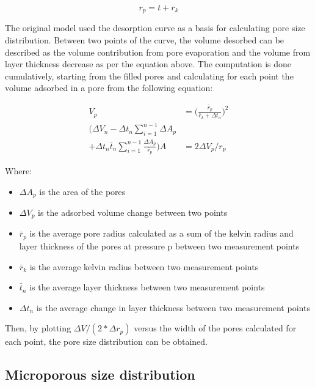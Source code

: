 \begin{equation}
    r_p = t + r_k
\end{equation}

The original model used the desorption curve as a basis for calculating pore size distribution.
Between two points of the curve, the volume desorbed can be described as the volume contribution
from pore evaporation and the volume from layer thickness decrease as per the equation
above. The computation is done cumulatively, starting from the filled pores and 
calculating for each point the volume adsorbed in a pore from the following equation:

\begin{align}
    V_p & = \Big( \frac{\bar{r}_p}{\bar{r}_k + \Delta t_n} \Big)^2 \\
    (\Delta V_n - \Delta t_n \sum_{i=1}^{n-1} \Delta A_p \\
    + \Delta t_n \bar{t}_n \sum_{i=1}^{n-1} \frac{\Delta A_p}{\bar{r}_p})
    A & = 2 \Delta V_p / r_p
\end{align}

Where:

\begin{itemize}
    
    \item \(\Delta A_p\) is the area of the pores
    \item \(\Delta V_p\) is the adsorbed volume change between two points
    \item \(\bar{r}_p\) is the average pore radius calculated as a sum of the
    kelvin radius and layer thickness of the pores at pressure p between two
    measurement points
    \item \(\bar{r}_k\) is the average kelvin radius between two measurement points
    \item \(\bar{t}_n\) is the average layer thickness between two measurement points
    \item \(\Delta t_n\) is the average change in layer thickness between two measurement points
    
\end{itemize}

Then, by plotting \(\Delta V / (2*\Delta r_p)\) versus the width of the pores calculated
for each point, the pore size distribution can be obtained.

\subsection{Microporous size distribution}

